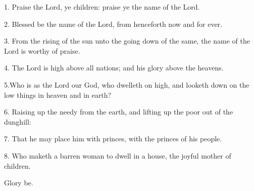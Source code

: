 1. Praise the Lord, ye children: praise ye the name of the Lord.
 	
2. Blessed be the name of the Lord, from henceforth now and for ever.
 	
3. From the rising of the sun unto the going down of the same, the name of the Lord is worthy of praise.
 	
4. The Lord is high above all nations; and his glory above the heavens.
 	
5.Who is as the Lord our God, who dwelleth on high, and looketh down on the low things in heaven and in earth?
 	
6. Raising up the needy from the earth, and lifting up the poor out of the dunghill:
 	
7. That he may place him with princes, with the princes of his people.
 	
8. Who maketh a barren woman to dwell in a house, the joyful mother of children. 

Glory be.